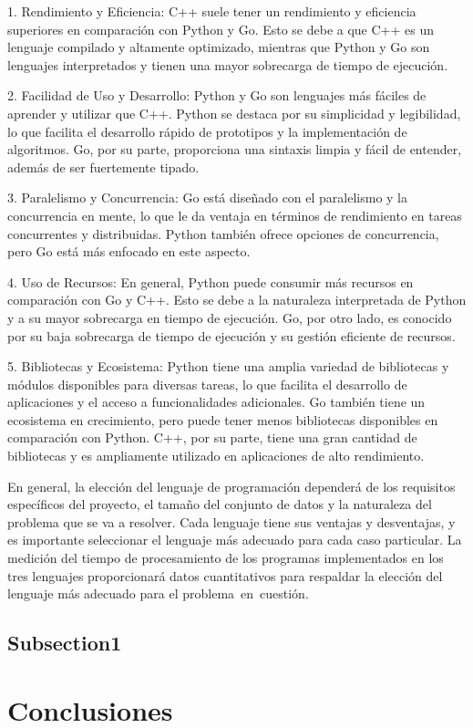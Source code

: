 1. Rendimiento y Eficiencia: C++ suele tener un rendimiento y eficiencia superiores en comparación con Python y Go. Esto se debe a que C++ es un lenguaje compilado y altamente optimizado, mientras que Python y Go son lenguajes interpretados y tienen una mayor sobrecarga de tiempo de ejecución.

2. Facilidad de Uso y Desarrollo: Python y Go son lenguajes más fáciles de aprender y utilizar que C++. Python se destaca por su simplicidad y legibilidad, lo que facilita el desarrollo rápido de prototipos y la implementación de algoritmos. Go, por su parte, proporciona una sintaxis limpia y fácil de entender, además de ser fuertemente tipado.

3. Paralelismo y Concurrencia: Go está diseñado con el paralelismo y la concurrencia en mente, lo que le da ventaja en términos de rendimiento en tareas concurrentes y distribuidas. Python también ofrece opciones de concurrencia, pero Go está más enfocado en este aspecto.

4. Uso de Recursos: En general, Python puede consumir más recursos en comparación con Go y C++. Esto se debe a la naturaleza interpretada de Python y a su mayor sobrecarga en tiempo de ejecución. Go, por otro lado, es conocido por su baja sobrecarga de tiempo de ejecución y su gestión eficiente de recursos.

5. Bibliotecas y Ecosistema: Python tiene una amplia variedad de bibliotecas y módulos disponibles para diversas tareas, lo que facilita el desarrollo de aplicaciones y el acceso a funcionalidades adicionales. Go también tiene un ecosistema en crecimiento, pero puede tener menos bibliotecas disponibles en comparación con Python. C++, por su parte, tiene una gran cantidad de bibliotecas y es ampliamente utilizado en aplicaciones de alto rendimiento.

En general, la elección del lenguaje de programación dependerá de los requisitos específicos del proyecto, el tamaño del conjunto de datos y la naturaleza del problema que se va a resolver. Cada lenguaje tiene sus ventajas y desventajas, y es importante seleccionar el lenguaje más adecuado para cada caso particular. La medición del tiempo de procesamiento de los programas implementados en los tres lenguajes proporcionará datos cuantitativos para respaldar la elección del lenguaje más adecuado para el problema en cuestión.

\subsection{Subsection1}


\section{Conclusiones}